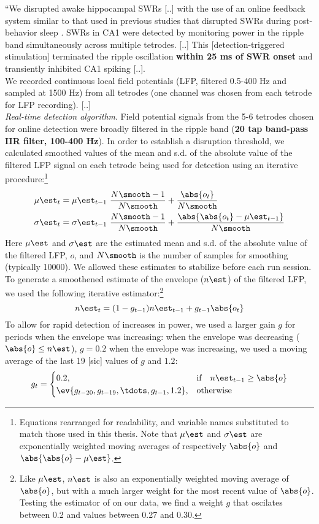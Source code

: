 ``We disrupted awake hippocampal SWRs [..] with the use of an online feedback system similar to that used in previous studies that disrupted SWRs during post-behavior sleep \cite{Girardeau2009,Ego-Stengel2009}. SWRs in CA1 were detected by monitoring power in the ripple band simultaneously across multiple tetrodes. [..] This [detection-triggered stimulation] terminated the ripple oscillation \textbf{within 25 ms of SWR onset} and transiently inhibited CA1 spiking [..].\\
We recorded continuous local field potentials (LFP, filtered 0.5-400 Hz and sampled at 1500 Hz) from all tetrodes (one channel was chosen from each tetrode for LFP recording). [..]\\
\emph{Real-time detection algorithm}. Field potential signals from the 5-6 tetrodes chosen for online detection were broadly filtered in the ripple band (\textbf{20 tap band-pass IIR filter, 100-400 Hz}). In order to establish a disruption threshold, we calculated smoothed values of the mean and s.d. of the absolute value of the filtered LFP signal on each tetrode being used for detection using an iterative procedure:\footnote{Equations rearranged for readability, and variable names substituted to match those used in this thesis. Note that $\mu\est$ and $\sigma\est$ are exponentially weighted moving averages of respectively $\abs{o}$ and $\abs{\abs{o} - \mu\est}$. }
\begin{align*}
\mu\est_t &= \mu\est_{t-1} \ \frac{N\smooth - 1}{N\smooth}
                + \frac{\abs{o_t}}{N\smooth} \\
\sigma\est_t &= \sigma\est_{t-1} \ \frac{N\smooth - 1}{N\smooth}
                + \frac{\abs{\abs{o_t} - \mu\est_{t-1}}}{N\smooth}
\end{align*}
Here $\mu\est$ and $\sigma\est$ are the estimated mean and s.d. of the absolute value of the filtered LFP, $o$, and $N\smooth$ is the  number of samples for smoothing (typically 10000). We allowed these estimates to stabilize before each run session. To generate a smoothened estimate of the envelope ($n\est$) of the filtered LFP, we used the following iterative estimator:\footnote{Like $\mu\est$, $n\est$ is also an exponentially weighted moving average of $\abs{o}$, but with a much larger weight for the most recent value of $\abs{o}$. Testing the estimator of \citeauthor*{Jadhav2012} on our data, we find a weight $g$ that oscilates between 0.2 and values between 0.27 and 0.30.}
\[
n\est_t = (1 - g_{t-1}) n\est_{t-1} + g_{t-1} \abs{o_t}
\]
To allow for rapid detection of increases in power, we used a larger gain $g$ for periods when the envelope was increasing: when the envelope was decreasing ($\abs{o} \le n\est$), $g = 0.2$ when the envelope was increasing, we used a moving average of the last 19 [sic] values of $g$ and $1.2$:
\[
g_t = 
\begin{cases}
    0.2,    & \text{if}\quad n\est_{t-1} \geq \abs{o} \\
    \ev{g_{t-20}, g_{t-19}, \tdots, g_{t-1}, 1.2},  & \text{otherwise}
\end{cases}
\]

